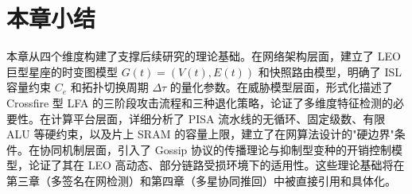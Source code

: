 \section{本章小结}

本章从四个维度构建了支撑后续研究的理论基础。在网络架构层面，建立了 LEO 巨型星座的时变图模型 $G(t)=(V(t), E(t))$ 和快照路由模型，明确了 ISL 容量约束 $C_e$ 和拓扑切换周期 $\Delta\tau$ 的量化参数。在威胁模型层面，形式化描述了 Crossfire 型 LFA 的三阶段攻击流程和三种退化策略，论证了多维度特征检测的必要性。在计算平台层面，详细分析了 PISA 流水线的无循环、固定级数、有限 ALU 等硬约束，以及片上 SRAM 的容量上限，建立了在网算法设计的"硬边界"条件。在协同机制层面，引入了 Gossip 协议的传播理论与抑制型变种的开销控制模型，论证了其在 LEO 高动态、部分链路受损环境下的适用性。这些理论基础将在第三章（多签名在网检测）和第四章（多星协同推回）中被直接引用和具体化。
